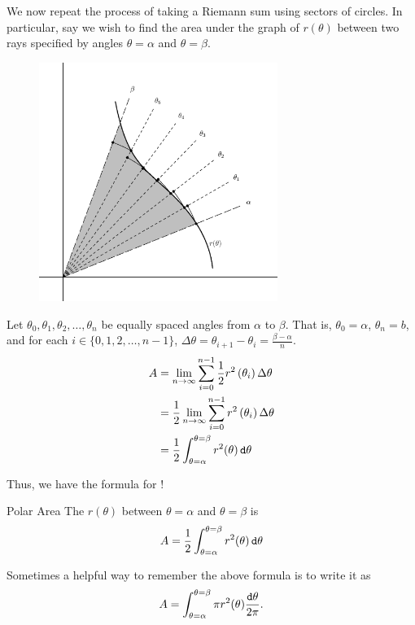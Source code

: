 We now repeat the process of taking a Riemann sum using sectors of circles.  In particular, say we wish to find the area under the graph of $r(\theta)$ between two rays specified by angles $\theta =\alpha$ and $\theta = \beta $.
\begin{figure}
	\begin{center}
		\includegraphics[width=220pt]{ChapterCalcIII/Figures/polararea.eps}
	\end{center}
\end{figure}

Let $\theta_0,\theta_1,\theta_2,\ldots,\theta_n$ be equally spaced angles from $\alpha$ to $\beta$.  That is, $\theta_0=\alpha$, $\theta_n=b$, and for each $i\in\lbrace 0,1,2,\ldots , n-1 \rbrace$, $\Delta \theta = \theta_{i+1}-\theta_{i}=\frac{\beta-\alpha}{n}$.
\begin{align*}
A&=\lim_{n\rightarrow \infty}\sum_{i=0}^{n-1} \frac{1}{2}r^2\left( \theta_i  \right) \Delta \theta \\
&=\frac{1}{2}\lim_{n\rightarrow \infty}\sum_{i=0}^{n-1}r^2\left( \theta_i  \right) \Delta \theta \\
&=\frac{1}{2}\int_{\theta=\alpha}^{\theta=\beta} r^2(\theta) \mathop{}\!\mathtt{d} \theta
\end{align*}

Thus, we have the formula for !\\
\vspace*{.7in} %

\begin{theorem}{Polar Area}
The  $r(\theta)$ between $\theta=\alpha$ and $\theta=\beta$ is $$A=\frac{1}{2}\int_{\theta=\alpha}^{\theta=\beta} r^2(\theta) \mathop{}\!\mathtt{d} \theta $$ 
\end{theorem}
Sometimes a helpful way to remember the above formula is to write it as
$$A=\int_{\theta=\alpha}^{\theta=\beta} \pi r^2(\theta) \frac{\mathop{}\!\mathtt{d} \theta}{2\pi}. $$

